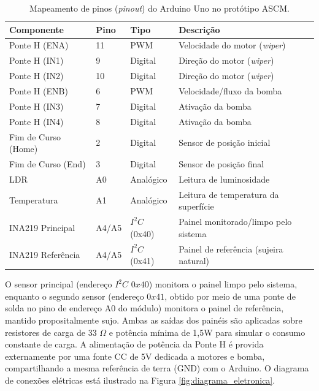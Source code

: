 \documentclass[12pt, a4paper]{article}
\begin{document}
\begin{table}[htbp]
    \centering
    \caption{Mapeamento de pinos (\textit{pinout}) do Arduino Uno no protótipo ASCM.}
    \label{tab:pinout}
    \begin{tabular}{p{4.2cm}p{1.6cm}p{2.0cm}p{5.0cm}}
    \toprule
    \textbf{Componente} & \textbf{Pino} & \textbf{Tipo} & \textbf{Descrição} \\
    \midrule
    Ponte H (ENA) & 11 & PWM & Velocidade do motor (\textit{wiper}) \\
    Ponte H (IN1) & 9 & Digital & Direção do motor (\textit{wiper}) \\
    Ponte H (IN2) & 10 & Digital & Direção do motor (\textit{wiper}) \\
    Ponte H (ENB) & 6 & PWM & Velocidade/fluxo da bomba \\
    Ponte H (IN3) & 7 & Digital & Ativação da bomba \\
    Ponte H (IN4) & 8 & Digital & Ativação da bomba \\
    Fim de Curso (Home) & 2 & Digital & Sensor de posição inicial \\
    Fim de Curso (End) & 3 & Digital & Sensor de posição final \\
    LDR & A0 & Analógico & Leitura de luminosidade \\
    Temperatura & A1 & Analógico & Leitura de temperatura da superfície \\
    INA219 Principal & A4/A5 & $I^2C$ (0x40) & Painel monitorado/limpo pelo sistema \\
    INA219 Referência & A4/A5 & $I^2C$ (0x41) & Painel de referência (sujeira natural) \\
    \bottomrule
    \end{tabular}
\end{table}

O sensor principal (endereço $I^2C$ $0x40$) monitora o painel limpo pelo sistema, enquanto o segundo sensor (endereço $0x41$, obtido por meio de uma ponte de solda no pino de endereço A0 do módulo) monitora o painel de referência, mantido propositalmente sujo. Ambas as saídas dos painéis são aplicadas sobre resistores de carga de 33 $\Omega$ e potência mínima de 1,5W para simular o consumo constante de carga. A alimentação de potência da Ponte H é provida externamente por uma fonte CC de 5V dedicada a motores e bomba, compartilhando a mesma referência de terra (GND) com o Arduino. O diagrama de conexões elétricas está ilustrado na Figura \ref{fig:diagrama_eletronica}.
\end{document}
